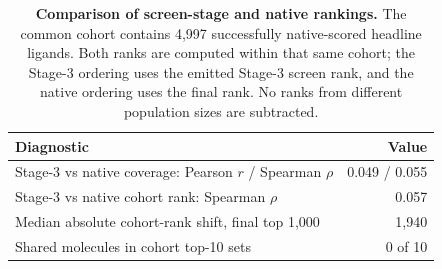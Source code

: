 \begin{table}[tbp]
\centering
\caption{\textbf{Comparison of screen-stage and native rankings.} The common cohort contains 4,997 successfully native-scored headline ligands. Both ranks are computed within that same cohort; the Stage-3 ordering uses the emitted Stage-3 screen rank, and the native ordering uses the final rank. No ranks from different population sizes are subtracted.}
\label{tab:evidence}
\footnotesize
\setlength{\tabcolsep}{4pt}
\begin{tabular}{@{}lr@{}}
\toprule
Diagnostic & Value \\
\midrule
Stage-3 vs native coverage: Pearson $r$ / Spearman $\rho$ & 0.049 / 0.055 \\
Stage-3 vs native cohort rank: Spearman $\rho$ & 0.057 \\
Median absolute cohort-rank shift, final top 1,000 & 1,940 \\
Shared molecules in cohort top-10 sets & 0 of 10 \\
\bottomrule
\end{tabular}
\end{table}
